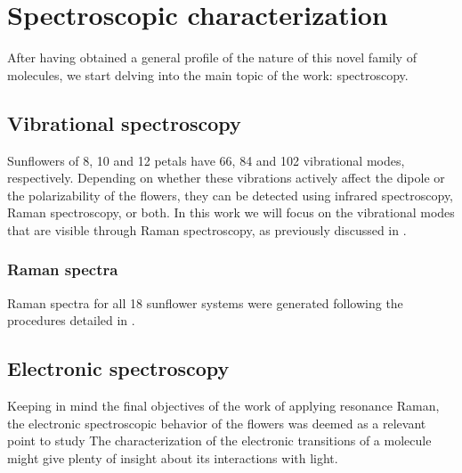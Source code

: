 

\section{Spectroscopic characterization}
After having obtained a general profile of the nature of this novel family of molecules, we start delving into the main topic of the work: spectroscopy.


\subsection{Vibrational spectroscopy}
Sunflowers of 8, 10 and 12 petals have 66, 84 and 102 vibrational modes, respectively.
Depending on whether these vibrations actively affect the dipole or the polarizability of the flowers, they can be detected using infrared spectroscopy, Raman spectroscopy, or both.
In this work we will focus on the vibrational modes that are visible through Raman spectroscopy, as previously discussed in .

\subsubsection{Raman spectra}
Raman spectra for all 18 sunflower systems were generated following the procedures detailed in .


\subsection{Electronic spectroscopy}
Keeping in mind the final objectives of the work of applying resonance Raman, the electronic spectroscopic behavior of the flowers was deemed as a relevant point to study
The characterization of the electronic transitions of a molecule might give plenty of insight about its interactions with light.

